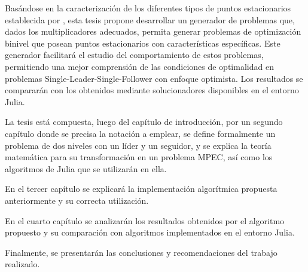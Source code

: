Basándose en la caracterización de los diferentes tipos de puntos estacionarios establecida por \cite{Flegel2003AFJ}, esta tesis propone desarrollar un generador de problemas que, dados los multiplicadores adecuados, permita generar problemas de optimización binivel que posean puntos estacionarios con características específicas. Este generador facilitará el estudio del comportamiento de estos problemas, permitiendo una mejor comprensión de las condiciones de optimalidad en problemas Single-Leader-Single-Follower con enfoque optimista. Los resultados se compararán con los obtenidos mediante solucionadores disponibles en el entorno Julia.

La tesis está compuesta, luego del capítulo de introducción, por un segundo capítulo donde se precisa la notación a emplear, se define formalmente un problema de dos niveles con un líder y un seguidor, y se explica la teoría matemática para su transformación en un problema MPEC, así como los algoritmos de Julia que se utilizarán en ella.

En el tercer capítulo se explicará la implementación algorítmica propuesta anteriormente y su correcta utilización. 

En el cuarto capítulo se analizarán los resultados obtenidos por el algoritmo propuesto y su comparación con algoritmos implementados en el entorno Julia.

Finalmente, se presentarán las conclusiones y recomendaciones del trabajo realizado.